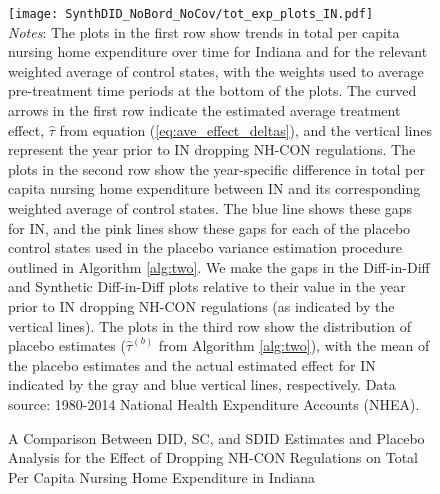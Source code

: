 \documentclass[../Main.tex]{subfiles}
\begin{document}
\newpage
{}
\begin{figure}[t] 
    \setlength{}
	\caption{\label{fig:tot_exp_plots_in} \centering A Comparison Between DID, SC, and SDID Estimates and Placebo Analysis for the Effect of Dropping NH-CON Regulations on Total Per Capita Nursing Home Expenditure in Indiana} {\centering\texttt{[image: SynthDID\_NoBord\_NoCov/tot\_exp\_plots\_IN.pdf]}}
    \vspace{-1.4cm}\\
    \scriptsize
		\textit{Notes}: The plots in the first row show trends in total per capita nursing home expenditure over time for Indiana and for the relevant weighted average of control states, with the weights used to average pre-treatment time periods at the bottom of the plots. The curved arrows in the first row indicate the estimated average treatment effect, $\hat{\tau}$ from equation (\ref{eq:ave_effect_deltas}), and the vertical lines represent the year prior to IN dropping NH-CON regulations. The plots in the second row show the year-specific difference in total per capita nursing home expenditure between IN and its corresponding weighted average of control states. The blue line shows these gaps for IN, and the pink lines show these gaps for each of the placebo control states used in the placebo variance estimation procedure outlined in Algorithm \ref{alg:two}. We make the gaps in the Diff-in-Diff and Synthetic Diff-in-Diff plots relative to their value in the year prior to IN dropping NH-CON regulations (as indicated by the vertical lines). The plots in the third row show the distribution of placebo estimates ($\hat{\tau}^{(b)}$ from Algorithm \ref{alg:two}), with the mean of the placebo estimates and the actual estimated effect for IN indicated by the gray and blue vertical lines, respectively. Data source: 1980-2014 National Health Expenditure Accounts (NHEA).
\end{figure}
\restoregeometry
\clearpage
\end{document}
